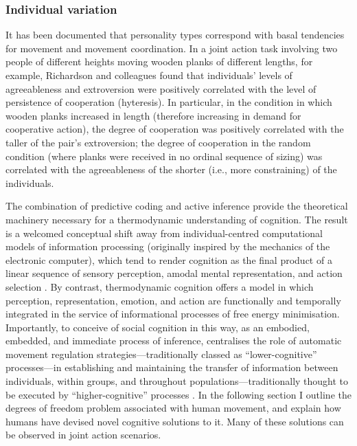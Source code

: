\subsubsection{Individual variation}

It has been documented that personality types correspond with basal tendencies for movement and movement coordination. In a joint action task involving two people of different heights moving wooden planks of different lengths, for example, Richardson and colleagues \textcite{Richardson2007} found that individuals’ levels of agreeableness and extroversion were positively correlated with the level of persistence of cooperation (hyteresis).  In particular, in the condition in which wooden planks increased in length (therefore increasing in demand for cooperative action), the degree of cooperation was positively correlated with the taller of the pair’s extroversion; the degree of cooperation in the random condition (where planks were received in no ordinal sequence of sizing) was correlated with the agreeableness of the shorter (i.e., more constraining) of the individuals.

The combination of predictive coding and active inference provide the theoretical machinery necessary for a thermodynamic understanding of cognition.  The result is a welcomed conceptual shift away from individual-centred computational models of information processing (originally inspired by the mechanics of the electronic computer), which tend to render cognition as the final product of a linear sequence of sensory perception, amodal mental representation, and action selection \citep{Lewis2005}.  By contrast, thermodynamic cognition offers a model in which perception, representation, emotion, and action are functionally and temporally integrated in the service of informational processes of free energy minimisation.  Importantly,  to conceive of social cognition in this way, as an embodied, embedded, and immediate process of inference, centralises the role of automatic movement regulation strategies---traditionally classed as ``lower-cognitive'' processes---in establishing and maintaining the transfer of information between individuals, within groups, and throughout populations---traditionally thought to be executed by  ``higher-cognitive'' processes \citep{Claidiere2014}.
In the following section I outline the degrees of freedom problem associated with human movement, and explain how humans have devised novel cognitive solutions to it.  Many of these solutions can be observed in joint action scenarios.


